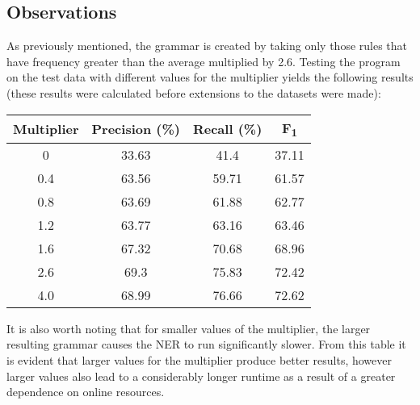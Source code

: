 \documentclass[draft]{article}
\begin{document}
\begin{multicols*}{2}
\section*{Observations}
As previously mentioned, the grammar is created by taking only those rules that have frequency greater than the average multiplied by 2.6. Testing the program on the test data with different values for the multiplier yields the following results (these results were calculated before extensions to the datasets were made):

\begin{center}
\begin{tabular}{| c || c | c | c |}
\hline
Multiplier & Precision (\%) & Recall (\%) & F\textsubscript{1} \\
\hline
0          & 33.63          & 41.4        & 37.11 \\
0.4        & 63.56          & 59.71       & 61.57 \\
0.8        & 63.69          & 61.88       & 62.77 \\
1.2        & 63.77          & 63.16       & 63.46 \\
1.6        & 67.32          & 70.68       & 68.96 \\
2.6        & 69.3           & 75.83       & 72.42 \\
4.0        & 68.99          & 76.66       & 72.62 \\

\hline
\end{tabular}
\end{center}

It is also worth noting that for smaller values of the multiplier, the larger resulting grammar causes the NER to run significantly slower. From this table it is evident that larger values for the multiplier produce better results, however larger values also lead to a considerably longer runtime as a result of a greater dependence on online resources.


\end{multicols*}
\end{document}

